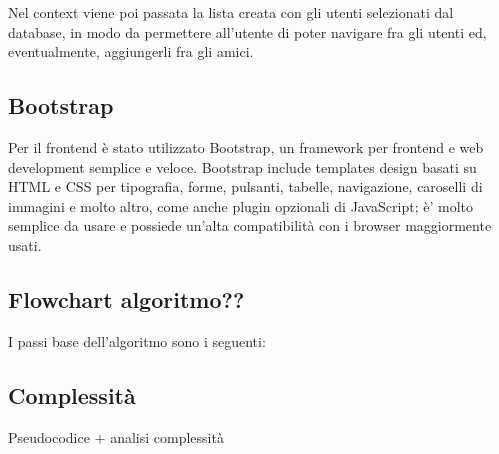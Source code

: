 Nel context viene poi passata la lista creata con gli utenti selezionati dal database, in modo da permettere all'utente di poter
navigare fra gli utenti ed, eventualmente, aggiungerli fra gli amici. 

\subsection{Bootstrap}
Per il frontend è stato utilizzato Bootstrap, un framework per frontend e web development semplice e veloce. 
Bootstrap include templates design basati su HTML e CSS per tipografia, forme, pulsanti, tabelle, navigazione, caroselli di 
immagini e molto altro, come anche plugin opzionali di JavaScript; è' molto semplice da usare e possiede un'alta 
compatibilità con i browser maggiormente usati. 


\subsection{Flowchart algoritmo??}
I passi base dell'algoritmo sono i seguenti: 

\subsection{Complessità}
Pseudocodice + analisi complessità

